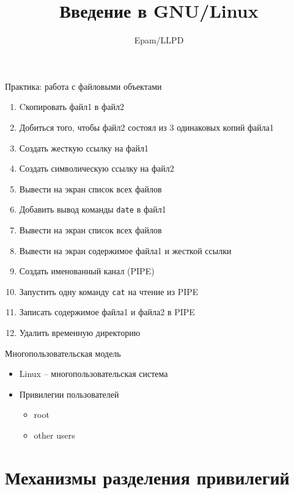 \documentclass[ignorenonframetext, professionalfonts, hyperref={pdftex, unicode}]{beamer}
\title{Введение в GNU/Linux}
\author{Epam/LLPD}
\begin{document}
\frame{
	\frametitle{}
	\titlepage
	\vspace{-0.5cm}
	\begin{center}
	\end{center}
}
\frame{
	\tableofcontents
}

\begin{frame}{Практика: работа с файловыми объектами}
	\begin{enumerate}
		\item Cкопировать файл1 в файл2
			\pause
		\item Добиться того, чтобы файл2 состоял из 3 одинаковых копий файла1
		\item Создать жесткую ссылку на файл1
		\item Создать символическую ссылку на файл2
		\item Вывести на экран список всех файлов
			\pause
		\item Добавить вывод команды {\tt date} в файл1
		\item Вывести на экран список всех файлов
		\item Вывести на экран содержимое файла1 и жесткой ссылки
		\item Создать именованный канал (PIPE)
		\item Запустить одну команду {\tt cat} на чтение из PIPE
		\item Записать содержимое файла1 и файла2 в PIPE
		\item Удалить временную директорию
	\end{enumerate}
\end{frame}
\begin{frame}{Многопользовательская модель}   
 \begin{itemize}
   \item Linux -- многопользовательская система
   \item Привилегии пользователей
     \begin{itemize}
       \item root
       \item other users
      \end{itemize}
     \end{itemize}
\end{frame}
\section{Механизмы разделения привилегий}
\end{document}
